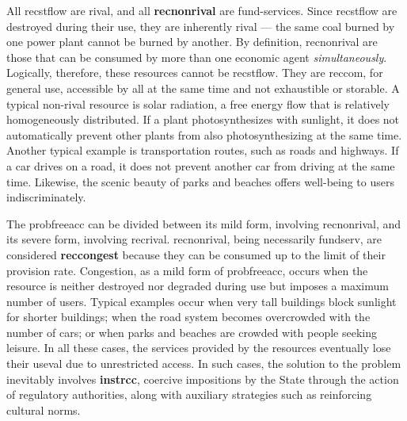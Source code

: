 \documentclass[./main_en.tex]{subfiles}
\begin{document}
\par All \gls{recstflow} are rival, and all \textbf{\gls{recnonrival}} are fund-services. Since \gls{recstflow} are destroyed during their use, they are inherently rival — the same coal burned by one power plant cannot be burned by another. By definition, \gls{recnonrival} are those that can be consumed by more than one economic agent \textit{simultaneously}. Logically, therefore, these resources cannot be \gls{recstflow}. They are \gls{reccom}, for general use, accessible by all at the same time and not exhaustible or storable. A typical non-rival resource is solar radiation, a free energy flow that is relatively homogeneously distributed. If a plant photosynthesizes with sunlight, it does not automatically prevent other plants from also photosynthesizing at the same time. Another typical example is transportation routes, such as roads and highways. If a car drives on a road, it does not prevent another car from driving at the same time. Likewise, the scenic beauty of parks and beaches offers well-being to users indiscriminately.

\par The \gls{probfreeacc} can be divided between its mild form, involving \gls{recnonrival}, and its severe form, involving \gls{recrival}. \gls{recnonrival}, being necessarily \gls{fundserv}, are considered \textbf{\gls{reccongest}} because they can be consumed up to the limit of their provision rate. Congestion, as a mild form of \gls{probfreeacc}, occurs when the resource is neither destroyed nor degraded during use but imposes a maximum number of users. Typical examples occur when very tall buildings block sunlight for shorter buildings; when the road \gls{system} becomes overcrowded with the number of cars; or when parks and beaches are crowded with people seeking leisure. In all these cases, the services provided by the resources eventually lose their \gls{useval} due to unrestricted access. In such cases, the solution to the problem inevitably involves \textbf{\gls{instrcc}}, coercive impositions by the State through the action of regulatory authorities, along with auxiliary strategies such as reinforcing cultural norms.
\end{document}
